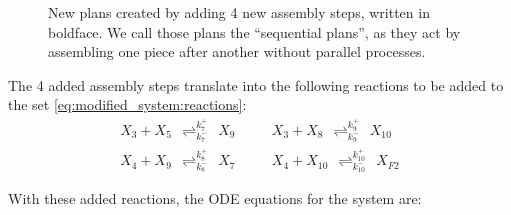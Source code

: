 	\begin{figure}[h!]
		\centering
		\; %
		\caption{New plans created by adding 4 new assembly steps, written in boldface. We call those plans the ``sequential plans'', as they act by assembling one piece after another without parallel processes.}
	\label{fig:assembly_plans_added} %
	\end{figure}
		
	The 4 added assembly steps translate into the following reactions to be added to the set \eqref{eq:modified_system:reactions}:
	\begin{eqnarray}
		X_3 + X_5 ~~{\mathop{\rightleftharpoons}_{k_{7}^-}^{k_{7}^+}}~~ X_{9} & \quad & X_3 + X_8 ~~{\mathop{\rightleftharpoons}_{k_{9}^-}^{k_{9}^+}}~~ X_{10} \nonumber \\
		X_4 + X_{9} ~~{\mathop{\rightleftharpoons}_{k_{8}^-}^{k_{8}^+}}~~ X_7 & & X_4 + X_{10} ~~{\mathop{\rightleftharpoons}_{k_{10}^-}^{k_{10}^+}}~~ X_{F2}
	\label{eq:reactionsExp}
	\end{eqnarray}
	
	With these added reactions, the ODE equations for the system are:
	
